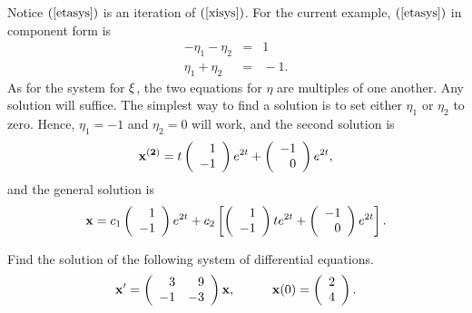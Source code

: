 \documentclass[leqno,DIV=calc,paper=a4,fontsize=11pt]{article}
\theoremstyle{definition}
\theoremstyle{plain}
\theoremstyle{remark}
\newcommand{\R}[1]{$(\ref{#1})$}
\begin{document}
Notice \R{etasys} is an iteration of \R{xisys}. For the current
example, \R{etasys} in component form is
\begin{eqnarray*}-\eta_1-\eta_2&=&1\\
\eta_1+\eta_2&=&\!\!\!-1.
\end{eqnarray*}
As for the system for ${\bf\xi}$, the two equations for $\eta$ are
multiples of one another. Any solution will suffice. The simplest
way to find a solution is to set either $\eta_1$ or $\eta_2$ to
zero. Hence, $\eta_1=-1$ and $\eta_2=0$ will work, and the second
solution is
\[
{\bf x^{(2)}}=t\left(\begin{array}{r}1\\-1\end{array}\right)e^{2t}+
\left(\begin{array}{r}-1\\0\end{array}\right)e^{2t},
\]
and the general solution is
\[
{\bf x}=c_1\left(\begin{array}{r}1\\-1\end{array}\right)e^{2t}+
c_2\left[\left(\begin{array}{r}1\\-1\end{array}\right)te^{2t}+
\left(\begin{array}{r}-1\\0\end{array}\right)e^{2t}\right].
\]

\vspace{.2in}
 Find the solution of the following
system of differential equations.
\[
{\bf x}' = \left(\begin{array}{rr}3&9\\-1&-3\end{array}\right){\bf x},
\hspace{.4in}{\bf x}(0)=
\left(\begin{array}{c}2\\4\end{array}\right).
\]
\end{document}
